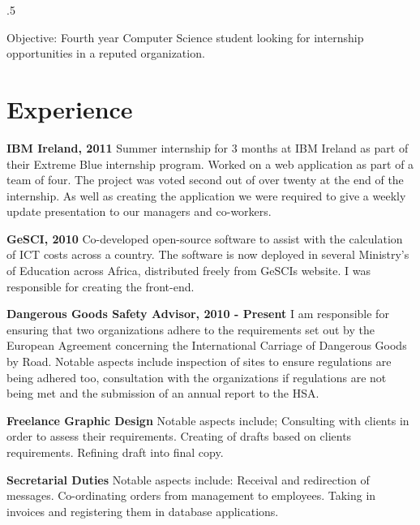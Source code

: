 \documentclass{res}
\begin{document}
 
\thispagestyle{empty} %
\address{14 Strand Road\\
Sutton\\
Dublin 13\\
086 3807768\\
divoapple@gmail.com}



\begin{resume}
\vspace{0.1in}
\moveleft.5\sectionwidth\centerline{Objective: Fourth year Computer Science student looking for internship opportunities in a reputed organization.}  

\section{Experience} 
\vspace{0.1in}
     
    {\bf IBM Ireland, 2011 }Summer internship for 3 months at IBM Ireland as part of their Extreme Blue internship program. Worked on a web application as part of a team of four. The project was voted second out of over twenty at the end of the internship. As well as creating the application we were required to give a weekly update presentation to our managers and co-workers.
 
    {\bf GeSCI, 2010} Co-developed open-source software to assist with the calculation of ICT costs across a country. The software is now deployed in several Ministry's of Education across Africa, distributed freely from GeSCIs website. I was responsible for creating the front-end.

    {\bf Dangerous Goods Safety Advisor, 2010 - Present} I am responsible for ensuring that two organizations adhere to the requirements set out by the European Agreement concerning the International Carriage of Dangerous Goods by Road. Notable aspects include inspection of sites to ensure regulations are being adhered too, consultation with the organizations if regulations are not being met and the submission of an annual report to the HSA. 
 
    {\bf Freelance Graphic Design} Notable aspects include; Consulting with clients in order to assess their requirements. Creating of drafts based on clients requirements. Refining draft into final copy.

 
    {\bf Secretarial Duties} Notable aspects include: Receival and redirection of messages. Co-ordinating orders from management to employees. Taking in invoices and registering them in database applications.


\end{resume}
\end{document}
